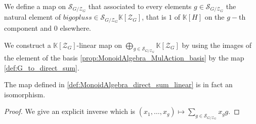 \begin{definition}
    \label{def:G_to_direct_sum}
    \leanok
    We define a map on $\mathcal{S}_{G/\mathcal{Z}_G}$ that associated to every elements
    $g\in\mathcal{S}_{G/\mathcal{Z}_G}$ the natural element of $bigoplus\limits{s\in\mathcal{S}_{G/\mathcal{Z}_G}}\mathbb{K}[\mathcal{Z}_G]$,
    that is $1$ of $\mathbb{K}[H]$ on the $g-$th component and 0 elsewhere.
\end{definition}


\begin{definition}
    \label{def:MonoidAlgebra_direct_sum_linear}
    \leanok
    We construct a $\mathbb{K}[\mathcal{Z}_G]$-linear map on $\bigoplus\limits_{g\in\mathcal{S}_{G/\mathcal{Z}_G}}\mathbb{K}[\mathcal{Z}_G]$
    by using the images of the element of the basis \ref{prop:MonoidAlgebra_MulAction_basis} by the map \ref{def:G_to_direct_sum}.
\end{definition}

\begin{definition}
    \label{def:MonoidAlgebra_direct_sum_1}
    \leanok
    The map defined in \ref{def:MonoidAlgebra_direct_sum_linear} is in fact an isomorphism.
    \begin{proof}
        We give an explicit inverse which is $(x_1,\dots,x_g)\mapsto\sum\limits_{g\in\mathcal{S}_{G/\mathcal{Z}_G}} x_gg$.
    \end{proof}
\end{definition}

